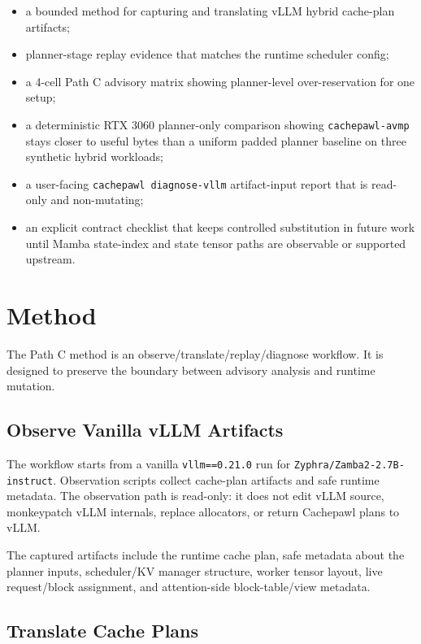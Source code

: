 \documentclass[11pt]{article}
\begin{document}
\begin{itemize}
\item a bounded method for capturing and translating vLLM hybrid cache-plan
artifacts;
\item planner-stage replay evidence that matches the runtime scheduler config;
\item a 4-cell Path C advisory matrix showing planner-level over-reservation
for one  setup;
\item a deterministic RTX 3060 planner-only comparison showing
\texttt{cachepawl-avmp} stays closer to useful bytes than a uniform padded
planner baseline on three synthetic hybrid workloads;
\item a user-facing \texttt{cachepawl diagnose-vllm} artifact-input report that
is read-only and non-mutating;
\item an explicit contract checklist that keeps controlled substitution in
future work until Mamba state-index and state tensor paths are observable or
supported upstream.
\end{itemize}

\section{Method}

The Path C method is an observe/translate/replay/diagnose workflow. It is
designed to preserve the boundary between advisory analysis and runtime
mutation.

\subsection{Observe Vanilla vLLM Artifacts}

The workflow starts from a vanilla \texttt{vllm==0.21.0} run for
\texttt{Zyphra/Zamba2-2.7B-instruct}. Observation scripts collect cache-plan
artifacts and safe runtime metadata. The observation path is read-only: it does
not edit vLLM source, monkeypatch vLLM internals, replace allocators, or return
Cachepawl plans to vLLM.

The captured artifacts include the runtime cache plan, safe metadata about the
planner inputs, scheduler/KV manager structure, worker tensor layout, live
request/block assignment, and attention-side block-table/view metadata.

\subsection{Translate Cache Plans}
\end{document}
